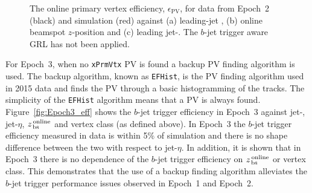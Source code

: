 \begin{figure}[!ht]
\begin{center}
\end{center}
\vspace{-1em}
\caption[The online primary vertex efficiency for data from Epoch~2 and simulation against leading-jet \pT{}, online beamspot $z$-position
  and leading jet-\eta. The $b$-jet trigger aware GRL has not been applied.]
        {The online primary vertex efficiency, $\epsilon_{\text{PV}}$, for data from Epoch~2 (black) and simulation (red) against (a) leading-jet \pT{}, (b) online beamspot $z$-position
  and (c) leading jet-\eta.
  The $b$-jet trigger aware GRL has not been applied.}
\label{fig:Epoch2_bperf}
\end{figure}



For Epoch~3, when no \verb|xPrmVtx| PV is found a backup PV finding algorithm is used.
The backup algorithm, known as \verb|EFHist|, is the PV finding algorithm used in 2015 data and finds the PV through a basic histogramming of the tracks.
The simplicity of the \verb|EFHist| algorithm means that a PV is always found.
Figure~\ref{fig:Epoch3_eff} shows the $b$-jet trigger efficiency in Epoch~3 against jet-\pT, jet-$\eta$,  $z_{\,\text{bs}}^{\text{\,online}}$ and vertex class (as defined above).
In Epoch~3 the $b$-jet trigger efficiency measured in data is within 5\% of simulation and there is no shape difference between the two with respect to jet-$\eta$.
In addition, it is shown that in Epoch~3 there is no dependence of the $b$-jet trigger efficiency on $z_{\,\text{bs}}^{\text{\,online}}$ or vertex class.
This demonstrates that the use of a backup finding algorithm alleviates the $b$-jet trigger performance issues observed in Epoch~1 and Epoch~2.

